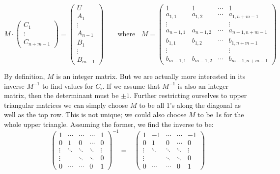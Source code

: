 \begin{equation}
	M \cdot 
		\begin{pmatrix}
			C_1 	\\
			\vdots 	\\
			C_{n+m-1}
		\end{pmatrix}
	=
		\begin{pmatrix}
			U 		\\[-0.5em] 
			A_1 	\\[-0.5em] 
			\vdots 	\\[-0.5em] 
			A_{n-1}	\\[-0.5em] 
			B_1 	\\[-0.5em] 
			\vdots 	\\[-0.5em] 
			B_{m-1}
		\end{pmatrix}
	\;\;\;\;\;\;\text{ where }\;\;
	M = \begin{pmatrix}
			1			& 1			& \cdots 	& 1 					\\[-0.5em]
			a_{1,1}		& a_{1,2}	& \cdots 	& a_{1, n+m-1} 		\\[-0.5em]
			\vdots 		&			&			& \vdots 			\\[-0.5em]
			a_{n-1,1}	& a_{n-1, 2}	& \cdots 	& a_{n-1, n+m-1} 	\\[-0.5em]
			b_{1,1} 		& b_{1,2} 	& \cdots 	& b_{1, n+m-1}		\\[-0.5em]
			\vdots 		& 			&			& \vdots 			\\[-0.5em]
			b_{m-1,1} 	& b_{m-1,2}	& \cdots 	& b_{m-1,n+m-1}
	\end{pmatrix}
\end{equation}


By definition, $M$ is an integer matrix.
But we are actually more interested in its inverse $M^{-1}$ to find values for $C_i$.
If we assume that $M^{-1}$ is also an integer matrix, then the determinant must be $\pm 1$.
Further restricting ourselves to upper triangular matrices we can simply choose $M$ to be all 1's along the diagonal
as well as the top row. 
This is not unique; we could also choose $M$ to be 1s for the whole upper triangle.
Assuming the former, we find the inverse to be:
\begin{equation}
	\begin{pmatrix}
		1 		&\cdots 	&\cdots 	&\cdots 	& 1 		\\[-0.5em]
		0		& 1		& 0 		&\cdots 	& 0 		\\[-0.5em]
		\vdots 	&\ddots 	&\ddots 	&\ddots 	&\vdots 	\\[-0.5em]
		\vdots 	&		&\ddots 	&\ddots 	& 0 		\\[-0.5em]
		0 		&\cdots 	&\cdots 	& 0 		& 1
	\end{pmatrix}^{-1}
	= \; \; \;
	\begin{pmatrix}
		1 		&-1	 	&\cdots 	&\cdots 	& -1		\\[-0.5em]
		0		& 1		& 0 		&\cdots 	& 0 		\\[-0.5em]
		\vdots 	&\ddots 	&\ddots 	&\ddots 	&\vdots 	\\[-0.5em]
		\vdots 	&		&\ddots 	&\ddots 	& 0 		\\[-0.5em]
		0 		&\cdots 	&\cdots 	& 0 		& 1
	\end{pmatrix}
\end{equation}


